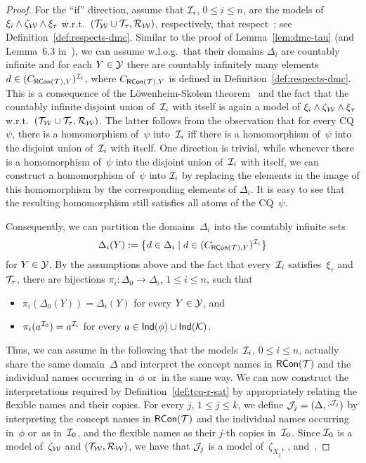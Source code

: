 \begin{proof}
    For the \enquote{if} direction, assume that $\mathcal{I}_i$, $0\le i\le n$, are the
    models of $\xi_i\land\zeta_\mathcal{W}\land\xi_\tau$ w.r.t.\
    $(\mathcal{T}_\mathcal{W}\cup\mathcal{T}_\tau,\mathcal{R}_\mathcal{W})$, respectively, that respect~\Dmc; see
    Definition~\ref{def:respects-dmc}.
    Similar to the proof of Lemma~\ref{lem:dmc-tau} (and Lemma~6.3
    in~\cite{BaGL-ToCL12}), we can assume w.l.o.g.\ that their domains
    $\Delta_i$ are countably infinite and for each $Y\in\mathcal{Y}$ there are
    countably infinitely many elements $d\in(C_{\operatorname{\mathsf{RCon}}(\mathcal{T}),Y})^{\mathcal{I}_i}$, where
    $C_{\operatorname{\mathsf{RCon}}(\mathcal{T}),Y}$ is defined in Definition~\ref{def:respects-dmc}.  This
    is a consequence of the Löwenheim-Skolem theorem~\cite{Loe-MA15,Sko-VS20}
    and the fact that the countably infinite disjoint union of~$\mathcal{I}_i$ with
    itself is again a model of $\xi_i\land\zeta_\mathcal{W}\land\xi_\tau$ w.r.t.\
    $(\mathcal{T}_\mathcal{W}\cup\mathcal{T}_\tau,\mathcal{R}_\mathcal{W})$.  The latter follows from the
    observation that for every CQ~$\psi$, there is a homomorphism of~$\psi$
    into~$\mathcal{I}_i$ iff there is a homomorphism of~$\psi$ into the disjoint union
    of~$\mathcal{I}_i$ with itself.
    One direction is trivial, while whenever there is a homomorphism of~$\psi$
    into the disjoint union of~$\mathcal{I}_i$ with itself, we can construct a
    homomorphism of~$\psi$ into $\mathcal{I}_i$ by replacing the elements in the image
    of this homomorphism by the corresponding elements of $\Delta_i$.  It is
    easy to see that the resulting homomorphism still satisfies all atoms of the
    CQ~$\psi$.

    Consequently, we can partition the domains~$\Delta_i$ into the countably
    infinite sets
    \[\Delta_i(Y):=\bigl\{d\in\Delta_i\mid d\in(C_{\operatorname{\mathsf{RCon}}(\mathcal{T}),Y})^{\mathcal{I}_i}\bigr\}\]
    for $Y\in\mathcal{Y}$.
    By the assumptions above and the fact that every~$\mathcal{I}_i$
    satisfies~$\xi_\tau$ and~$\mathcal{T}_\tau$, there are bijections
    $\pi_i\colon\Delta_0\to\Delta_i$, $1\le i\le n$, such that
    \begin{itemize}
        \item $\pi_i(\Delta_0(Y))=\Delta_i(Y)$ for every $Y\in\mathcal{Y}$, and
        \item $\pi_i(a^{\mathcal{I}_0})=a^{\mathcal{I}_i}$ for every
            $a\in\mathsf{Ind}(\phi)\cup\mathsf{Ind}(\mathcal{K})$.
    \end{itemize}
    Thus, we can assume in the following that the models~$\mathcal{I}_i$,
    $0\le i\le n$, actually share the same domain~$\Delta$ and interpret the
    concept names in $\operatorname{\mathsf{RCon}}(\mathcal{T})$ and the individual names occurring in~$\phi$
    or~\Kmc in the same way.
    We can now construct the interpretations required by
    Definition~\ref{def:tcq-r-sat} by appropriately relating the flexible names
    and their copies.  For every $j$, $1\le j\le k$, we define
    $\mathcal{J}_j=(\Delta,\cdot^{\mathcal{J}_j})$ by interpreting
    the concept names in $\operatorname{\mathsf{RCon}}(\mathcal{T})$ and the individual names occurring
    in~$\phi$ or~\Kmc as in~$\mathcal{I}_0$, and the flexible names as their $j$-th
    copies in~$\mathcal{I}_0$.  Since $\mathcal{I}_0$ is a model of~$\zeta_\mathcal{W}$ and
    $(\mathcal{T}_\mathcal{W},\mathcal{R}_\mathcal{W})$, we have that $\mathcal{J}_j$ is a model of~$\zeta_{X_j}$,
    \Tmc, and~\Rmc.


\end{proof}

